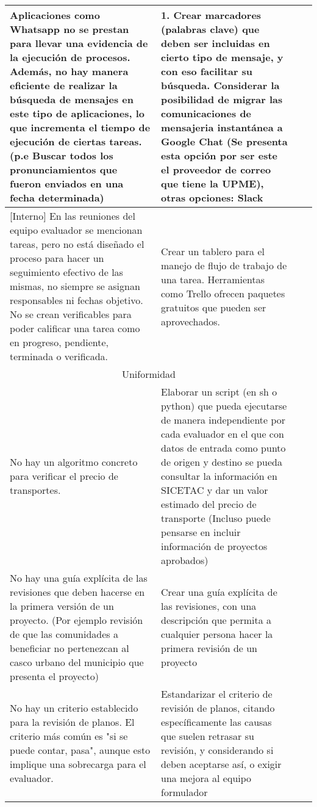 \documentclass{article}
\begin{document}
\begin{landscape}
\begin{longtable}{ |p{12cm}|p{8cm}|p{2cm}|p{2cm}|}
Aplicaciones como Whatsapp no se prestan para llevar una evidencia de la ejecución de procesos. Además, no hay manera eficiente de realizar la búsqueda de mensajes en este tipo de aplicaciones, lo que incrementa el tiempo de ejecución de ciertas tareas. (p.e Buscar todos los pronunciamientos que fueron enviados en una fecha determinada) & 1. Crear marcadores (palabras clave) que deben ser incluidas en cierto tipo de mensaje, y con eso facilitar su búsqueda. Considerar la posibilidad de migrar las comunicaciones de mensajeria instantánea a Google Chat (Se presenta esta opción por ser este el proveedor de correo que tiene la UPME), otras opciones: Slack & & \\\hline

[Interno] En las reuniones del equipo evaluador se mencionan tareas, pero no está diseñado el proceso para hacer un seguimiento efectivo de las mismas, no siempre se asignan responsables ni fechas objetivo. No se crean verificables para poder calificar una tarea como en progreso, pendiente, terminada o verificada.  & Crear un tablero para el manejo de flujo de trabajo de una tarea. Herramientas como Trello ofrecen paquetes gratuitos que pueden ser aprovechados.  & & \\\hline

\multicolumn{2}{|c|}{Uniformidad} & & \\\hline
No hay un algoritmo concreto para verificar el precio de transportes. & Elaborar un script (en sh o python) que pueda ejecutarse de manera independiente por cada evaluador en el que con datos de entrada como punto de origen y destino se pueda consultar la información en SICETAC y dar un valor estimado del precio de transporte (Incluso puede pensarse en incluir información de proyectos aprobados) & & \\\hline

No hay una guía explícita de las revisiones que deben hacerse en la primera versión de un proyecto. (Por ejemplo revisión de que las comunidades a beneficiar no pertenezcan al casco urbano del municipio que presenta el proyecto) & Crear una guía explícita de las revisiones, con una descripción que permita a cualquier persona hacer la primera revisión de un proyecto & & \\\hline

No hay un criterio establecido para la revisión de planos. El criterio más común es "si se puede contar, pasa", aunque esto implique una sobrecarga para el evaluador.  & Estandarizar el criterio de revisión de planos, citando específicamente las causas que suelen retrasar su revisión, y considerando si deben aceptarse así, o exigir una mejora al equipo formulador & & \\\hline


\end{longtable}
\end{landscape}
\end{document}

